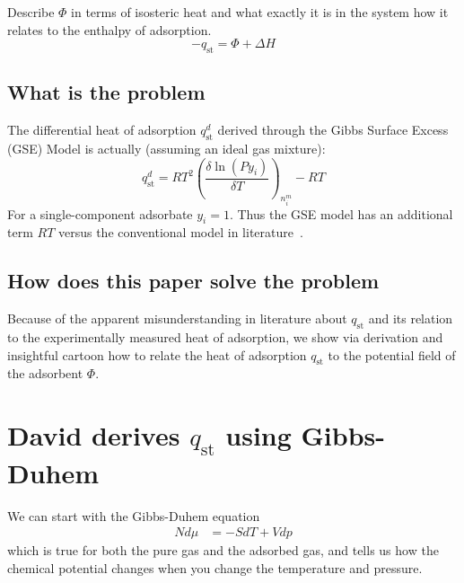 \documentclass[letterpaper,twocolumn,amsmath,amssymb,jcp,aps,10pt]{revtex4-1}
\begin{document}
Describe $\Phi$ in terms of isosteric heat and what exactly it is in the system how it relates to the enthalpy of adsorption.
\begin{equation}
-q_\text{st} = \Phi + \Delta H
\end{equation}
\subsection{What is the problem}

The differential heat of adsorption $q_\text{st}^d$ derived through the Gibbs Surface Excess (GSE) Model is actually (assuming an ideal gas mixture):
\begin{equation}
    q_\text{st}^d = R T^2\left( \frac{\delta \ln \left( P y_i \right)}{\delta T} \right)_{n_i^m} - RT
\end{equation}
For a single-component adsorbate $y_i = 1$. Thus the GSE model has an additional term $RT$ versus the conventional model
in literature~\cite{sircar1999heat,sircar1999isosteric}.

\subsection{How does this paper solve the problem}
Because of the apparent misunderstanding in literature about $q_\text{st}$ and its relation to the
experimentally measured heat of adsorption, we show via derivation and insightful cartoon how to relate
the heat of adsorption $q_\text{st}$ to the potential field of the adsorbent $\Phi$.

\section{David derives $q_\text{st}$ using Gibbs-Duhem}
We can start with the Gibbs-Duhem equation
\begin{align}
  Nd\mu &= -SdT + Vdp
\end{align}
which is true for both the pure gas and the adsorbed gas, and tells us
how the chemical potential changes when you change the temperature and
pressure.
\end{document}

